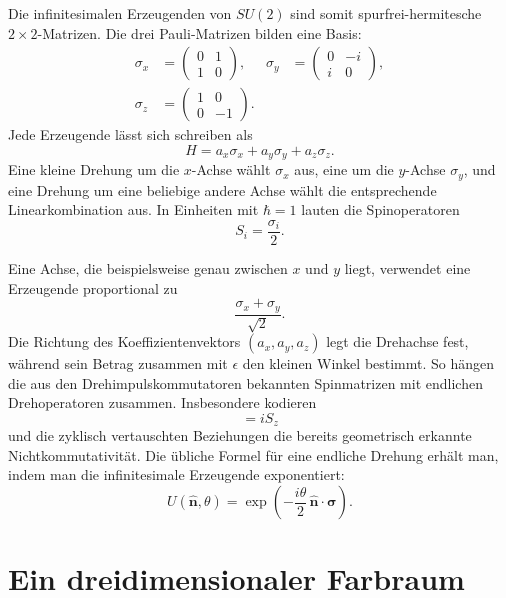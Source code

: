 Die infinitesimalen Erzeugenden von \(SU(2)\) sind somit spurfrei-hermitesche \(2\times2\)-Matrizen. Die drei Pauli-Matrizen bilden eine Basis:
\begin{equation}
\begin{aligned}
\sigma_x&=
\begin{pmatrix}0&1\\1&0\end{pmatrix},
&
\sigma_y&=
\begin{pmatrix}0&-i\\i&0\end{pmatrix},
\\[0.4em]
\sigma_z&=
\begin{pmatrix}1&0\\0&-1\end{pmatrix}.
\end{aligned}
\end{equation}
Jede Erzeugende lässt sich schreiben als
\begin{equation}
H=a_x\sigma_x+a_y\sigma_y+a_z\sigma_z.
\end{equation}
Eine kleine Drehung um die \(x\)-Achse wählt \(\sigma_x\) aus, eine um die \(y\)-Achse \(\sigma_y\), und eine Drehung um eine beliebige andere Achse wählt die entsprechende Linearkombination aus. In Einheiten mit \(\hbar=1\) lauten die Spinoperatoren
\begin{equation}
S_i=\frac{\sigma_i}{2}.
\end{equation}

Eine Achse, die beispielsweise genau zwischen \(x\) und \(y\) liegt, verwendet eine Erzeugende proportional zu
\begin{equation}
\frac{\sigma_x+\sigma_y}{\sqrt2}.
\end{equation}
Die Richtung des Koeffizientenvektors \((a_x,a_y,a_z)\) legt die Drehachse fest, während sein Betrag zusammen mit \(\epsilon\) den kleinen Winkel bestimmt. So hängen die aus den Drehimpulskommutatoren bekannten Spinmatrizen mit endlichen Drehoperatoren zusammen. Insbesondere kodieren
\begin{equation}
[S_x,S_y]=iS_z
\end{equation}
und die zyklisch vertauschten Beziehungen die bereits geometrisch erkannte Nichtkommutativität. Die übliche Formel für eine endliche Drehung erhält man, indem man die infinitesimale Erzeugende exponentiert:
\begin{equation}
U(\hat{\boldsymbol n},\theta)
=\exp\left(-\frac{i\theta}{2}\,
\hat{\boldsymbol n}\cdot\boldsymbol\sigma\right).
\end{equation}\section{Ein dreidimensionaler Farbraum}

